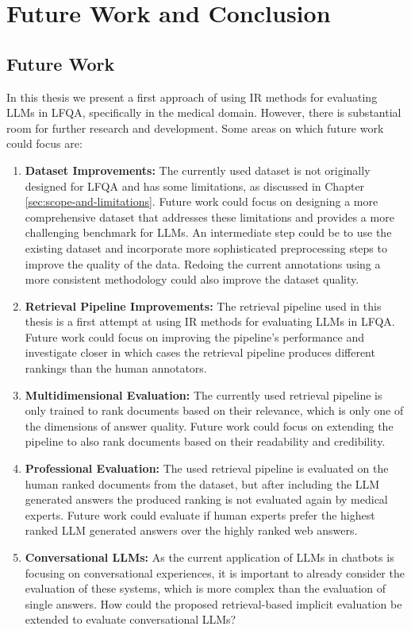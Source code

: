 \chapter{Future Work and Conclusion}\label{conclusion}

\section{Future Work}
In this thesis we present a first approach of using IR methods for evaluating LLMs in LFQA, specifically in the medical domain.
However, there is substantial room for further research and development.
Some areas on which future work could focus are:

\begin{enumerate}
    \item \textbf{Dataset Improvements:} The currently used dataset is not originally designed for LFQA and has some limitations, as discussed in Chapter \ref{sec:scope-and-limitations}. Future work could focus on designing a more comprehensive dataset that addresses these limitations and provides a more challenging benchmark for LLMs. An intermediate step could be to use the existing dataset and incorporate more sophisticated preprocessing steps to improve the quality of the data. Redoing the current annotations using a more consistent methodology could also improve the dataset quality.
    \item \textbf{Retrieval Pipeline Improvements:} The retrieval pipeline used in this thesis is a first attempt at using IR methods for evaluating LLMs in LFQA. Future work could focus on improving the pipeline's performance and investigate closer in which cases the retrieval pipeline produces different rankings than the human annotators.
    \item \textbf{Multidimensional Evaluation:} The currently used retrieval pipeline is only trained to rank documents based on their relevance, which is only one of the dimensions of answer quality. Future work could focus on extending the pipeline to also rank documents based on their readability and credibility.
    \item \textbf{Professional Evaluation:} The used retrieval pipeline is evaluated on the human ranked documents from the dataset, but after including the LLM generated answers the produced ranking is not evaluated again by medical experts. Future work could evaluate if human experts prefer the highest ranked LLM generated answers over the highly ranked web answers.
    \item \textbf{Conversational LLMs:} As the current application of LLMs in chatbots is focusing on conversational experiences, it is important to already consider the evaluation of these systems, which is more complex than the evaluation of single answers. How could the proposed retrieval-based implicit evaluation be extended to evaluate conversational LLMs?
\end{enumerate}


